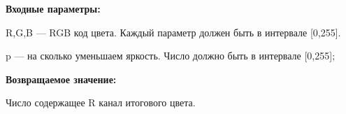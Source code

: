 \textbf{Входные параметры:}  

R,G,B --- RGB код цвета. Каждый параметр должен быть в интервале [0,255].

p --- на сколько уменьшаем яркость. Число должно быть в интервале [0,255];

\textbf{Возвращаемое значение:}

Число содержащее R канал итогового цвета.
